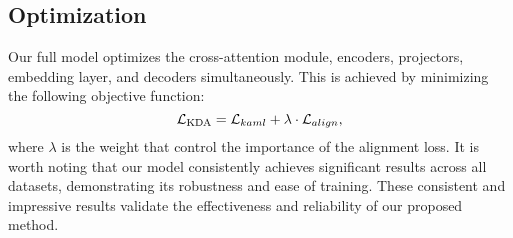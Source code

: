 \documentclass[10pt,twocolumn,letterpaper]{article}
\begin{document}
\subsection{Optimization}
Our full model optimizes the cross-attention module, encoders, projectors, embedding layer, and decoders simultaneously. This is achieved by minimizing the following objective function:
\begin{equation}
    \mathcal{L}_{\rm KDA} = \mathcal{L}_{kaml} + \lambda \cdot \mathcal{L}_{align},
\end{equation}
where $\lambda$ is the weight that control the importance of the alignment loss. It is worth noting that our model consistently achieves significant results across all datasets, demonstrating its robustness and ease of training. These consistent and impressive results validate the effectiveness and reliability of our proposed method.
\end{document}
